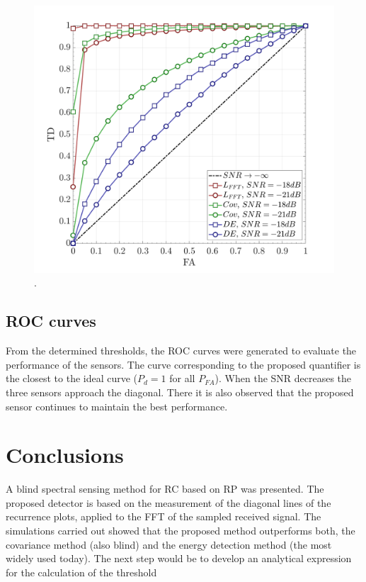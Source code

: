 \documentclass[lettersize,journal]{IEEEtran}
\begin{document}
\begin{figure}[htbp]
    \centerline{\includegraphics[width=1\columnwidth]{ROC.png}}
    \caption{.}
    \label{fig:ROC_max}
\end{figure}

\subsection{ROC curves}\label{ROC}

From the determined thresholds, the ROC curves were generated to evaluate the performance of the sensors.
 The curve corresponding to the proposed quantifier is the closest to the ideal curve ($P_{d}=1$ for all $P_{FA}$). When the SNR decreases the three sensors approach the diagonal. There it is also observed that the proposed sensor continues to maintain the best performance.

\section{Conclusions}\label{secConclu}

A blind spectral sensing method for RC based on RP was presented. The proposed detector is based on the measurement of the diagonal lines of the recurrence plots, applied to the FFT of the sampled received signal. The simulations carried out showed that the proposed method outperforms both, the covariance method (also blind) and the energy detection method (the most widely used today).
The next step would be to develop an analytical expression for the calculation of the threshold
\end{document}
